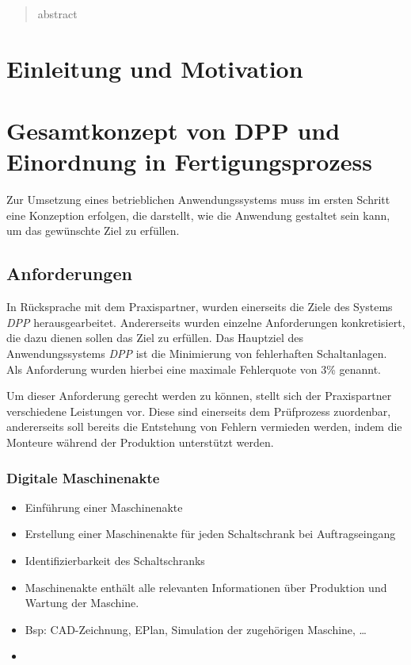 \documentclass[
    type=Projektarbeit,
    status=draft, %
    language=german, %
    bibengine=bibtex,
]{unibwm-inf-thesis}
\begin{document}
    \tableofcontents

    \mainmatter
    \begin{abstract}
        abstract
    \end{abstract}


    \chapter{Einleitung und Motivation}


    \chapter{Gesamtkonzept von DPP und Einordnung in Fertigungsprozess}
    Zur Umsetzung eines betrieblichen Anwendungssystems muss im ersten Schritt eine Konzeption erfolgen, die darstellt,
    wie die Anwendung gestaltet sein kann, um das gewünschte Ziel zu erfüllen.
    \section{Anforderungen}
    In Rücksprache mit dem Praxispartner, wurden einerseits die Ziele des Systems \textit{DPP} herausgearbeitet.
    Andererseits wurden einzelne Anforderungen konkretisiert, die dazu dienen sollen das Ziel zu erfüllen.
    Das Hauptziel des Anwendungssystems \textit{DPP} ist die Minimierung von fehlerhaften Schaltanlagen.
    Als Anforderung wurden hierbei eine maximale Fehlerquote von 3\% genannt.

    Um dieser Anforderung gerecht werden zu können, stellt sich der Praxispartner verschiedene Leistungen vor.
    Diese sind einerseits dem Prüfprozess zuordenbar, andererseits soll bereits die Entstehung von Fehlern vermieden
    werden, indem die Monteure während der Produktion unterstützt werden.

    \subsection{Digitale Maschinenakte}
    \begin{itemize}
        \item Einführung einer Maschinenakte
        \item Erstellung einer Maschinenakte für jeden Schaltschrank bei Auftragseingang
        \item Identifizierbarkeit des Schaltschranks
        \item Maschinenakte enthält alle relevanten Informationen über Produktion und Wartung der Maschine.
        \item Bsp: CAD-Zeichnung, EPlan, Simulation der zugehörigen Maschine, \ldots
    \item \end{itemize}
\end{document}
